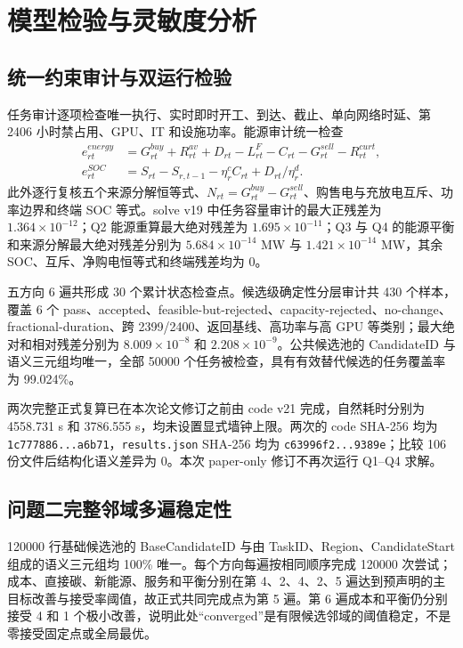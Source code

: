 \section{模型检验与灵敏度分析}

\subsection{统一约束审计与双运行检验}
任务审计逐项检查唯一执行、实时即时开工、到达、截止、单向网络时延、第 2406 小时禁占用、GPU、IT 和设施功率。能源审计统一检查
\begin{align}
e^{energy}_{rt}&=G^{buy}_{rt}+R^{av}_{rt}+D_{rt}-L^F_{rt}-C_{rt}-G^{sell}_{rt}-R^{curt}_{rt},\\
e^{SOC}_{rt}&=S_{rt}-S_{r,t-1}-\eta_r^cC_{rt}+D_{rt}/\eta_r^d.
\end{align}
此外逐行复核五个来源分解恒等式、$N_{rt}=G^{buy}_{rt}-G^{sell}_{rt}$、购售电与充放电互斥、功率边界和终端 SOC 等式。solve v19 中任务容量审计的最大正残差为 $1.364\times10^{-12}$；Q2 能源重算最大绝对残差为 $1.695\times10^{-11}$；Q3 与 Q4 的能源平衡和来源分解最大绝对残差分别为 $5.684\times10^{-14}$ MW 与 $1.421\times10^{-14}$ MW，其余 SOC、互斥、净购电恒等式和终端残差均为 0。

五方向 6 遍共形成 30 个累计状态检查点。候选级确定性分层审计共 430 个样本，覆盖 6 个 pass、accepted、feasible-but-rejected、capacity-rejected、no-change、fractional-duration、跨 2399/2400、返回基线、高功率与高 GPU 等类别；最大绝对和相对残差分别为 $8.009\times10^{-8}$ 和 $2.208\times10^{-9}$。公共候选池的 CandidateID 与语义三元组均唯一，全部 50000 个任务被检查，具有有效替代候选的任务覆盖率为 99.024\%。

两次完整正式复算已在本次论文修订之前由 code v21 完成，自然耗时分别为 4558.731 s 和 3786.555 s，均未设置显式墙钟上限。两次的 code SHA-256 均为 \texttt{1c777886...a6b71}，\texttt{results.json} SHA-256 均为 \texttt{c63996f2...9389e}；比较 106 份文件后结构化语义差异为 0。本次 paper-only 修订不再次运行 Q1--Q4 求解。

\subsection{问题二完整邻域多遍稳定性}
120000 行基础候选池的 BaseCandidateID 与由 TaskID、Region、CandidateStart 组成的语义三元组均 100\% 唯一。每个方向每遍按相同顺序完成 120000 次尝试；成本、直接碳、新能源、服务和平衡分别在第 4、2、4、2、5 遍达到预声明的主目标改善与接受率阈值，故正式共同完成点为第 5 遍。第 6 遍成本和平衡仍分别接受 4 和 1 个极小改善，说明此处“converged”是有限候选邻域的阈值稳定，不是零接受固定点或全局最优。

